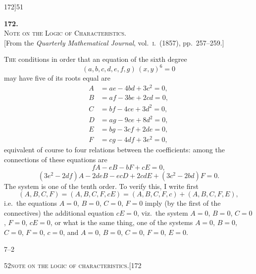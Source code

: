 \documentclass[11pt]{article}
\begin{document}
\newpage

\begin{center}
\small 172]\hfill\textsc{51}
\end{center}

\bigskip

\begin{center}
{\large\textbf{172.}}\\[1em]
{\large\scshape Note on the Logic of Characteristics.}\\[1em]
{\small [From the \textit{Quarterly Mathematical Journal}, vol.~\textsc{i}.\ (1857), pp.~257--259.]}
\end{center}

\bigskip

\textsc{The} conditions in order that an equation of the sixth degree
\[
(a, b, c, d, e, f, g)\,(x, y)^{6} = 0
\]
may have five of its roots equal are
\begin{align*}
A &= ae - 4bd + 3c^{2} = 0,\\
B &= af - 3be + 2cd = 0,\\
C &= bf - 4ce + 3d^{2} = 0,\\
D &= ag - 9ce + 8d^{2} = 0,\\
E &= bg - 3cf + 2de = 0,\\
F &= cg - 4df + 3e^{2} = 0,
\end{align*}
equivalent of course to four relations between the coefficients: among the connections
of these equations are
\[
fA - eB - bF + cE = 0,
\]
\[
(3e^{2} - 2df)A - 2deB - ecD + 2cdE + (3c^{2} - 2bd)F = 0.
\]
The system is one of the tenth order. To verify this, I write first
\[
(A, B, C, F) = (A, B, C, F, cE) = (A, B, C, F, c) + (A, B, C, F, E),
\]
i.e.\ the equations $A = 0$, $B = 0$, $C = 0$, $F = 0$ imply (by the first of the connectives) the
additional equation $cE = 0$, viz.\ the system $A = 0$, $B = 0$, $C = 0$, $F = 0$, $cE = 0$, or what
is the same thing, one of the systems $A = 0$, $B = 0$, $C = 0$, $F = 0$, $c = 0$, and $A = 0$,
$B = 0$, $C = 0$, $F = 0$, $E = 0$.

\begin{flushright}\small 7--2\end{flushright}

\newpage

\begin{center}
\small\textsc{52}\hfill\textsc{note on the logic of characteristics.}\hfill[172
\end{center}
\end{document}
